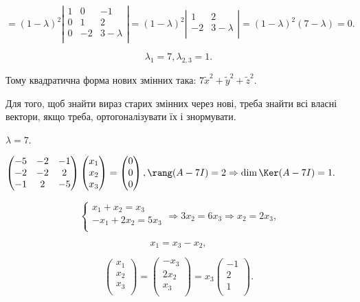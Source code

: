 $ = (1 - \lambda)^2 \left| \begin{matrix}
	1 & 0 & -1 \\
	0 & 1 & 2 \\
	0 & -2 & 3 - \lambda \\
\end{matrix} \right| = (1 - \lambda)^2 \left| \begin{matrix}
	1 & 2 \\
	-2 & 3 - \lambda \\
\end{matrix} \right| = (1 - \lambda)^2 (7 - \lambda) = 0.$

$$\lambda_1 = 7, \lambda_{2,3} = 1.$$

Тому квадратична форма нових змінних така: $7\tilde{x}^2 + \tilde{y}^2 + \tilde{z}^2$.

Для того, щоб знайти вираз старих змінних через нові, треба знайти всі
власні вектори, якщо треба, ортогоналізувати їх і знормувати.

$\lambda = 7$.

$\begin{pmatrix}
	-5 & -2 & -1 \\
	-2 & -2 & 2  \\
	-1 &  2 & -5 \\
\end{pmatrix} \begin{pmatrix}
	x_1 \\
	x_2 \\
	x_3 \\
\end{pmatrix} = \begin{pmatrix}
	0 \\
	0 \\
	0 \\
\end{pmatrix}, \rang(A - 7I) = 2 \Rightarrow \dim \Ker(A - 7I) = 1.$

$$\left\{ \begin{array}{l}
	x_1 + x_2 = x_3 \\
	-x_1 + 2x_2 = 5x_3 \\
\end{array} \right. \Rightarrow 3x_2 = 6x_3 \Rightarrow x_2 = 2x_3,$$

$$x_1 = x_3 - x_2,$$

$$\begin{pmatrix}
	x_1 \\
	x_2 \\
	x_3 \\
\end{pmatrix} = \begin{pmatrix}
	-x_3 \\
	2x_2 \\
	x_3 \\
\end{pmatrix} = x_3 \begin{pmatrix}
	-1 \\
	2 \\
	1 \\
\end{pmatrix}.$$


